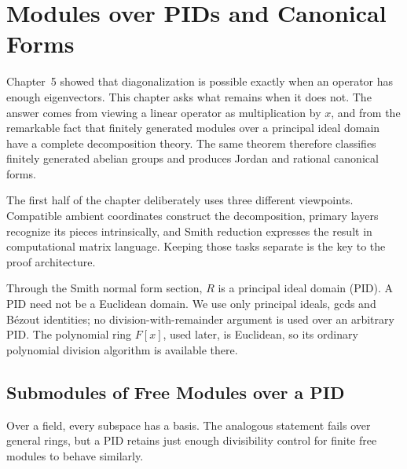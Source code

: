 \chapter[PID Modules and Canonical Forms]{Modules over PIDs and Canonical Forms}\label{chap:pid-modules-canonical-forms}

Chapter~5 showed that diagonalization is possible exactly when an operator has
enough eigenvectors. This chapter asks what remains when it does not. The
answer comes from viewing a linear operator as multiplication by \(x\), and
from the remarkable fact that finitely generated modules over a principal
ideal domain have a complete decomposition theory. The same theorem therefore
classifies finitely generated abelian groups and produces Jordan and rational
canonical forms.

The first half of the chapter deliberately uses three different viewpoints.
Compatible ambient coordinates construct the decomposition, primary layers
recognize its pieces intrinsically, and Smith reduction expresses the result in computational
matrix language.  Keeping those tasks separate is the key to the proof
architecture.

Through the Smith normal form section, \(R\) is a principal ideal domain (PID).
A PID need not be a Euclidean domain. We use only principal ideals, gcds and
B\'ezout identities; no division-with-remainder argument is used over an
arbitrary PID. The polynomial ring \(F[x]\), used later, is Euclidean, so its
ordinary polynomial division algorithm is available there.

\section{Submodules of Free Modules over a PID}\label{sec:pid-submodules-free}
Over a field, every subspace has a basis. The analogous statement fails over
general rings, but a PID retains just enough divisibility control for finite
free modules to behave similarly.


